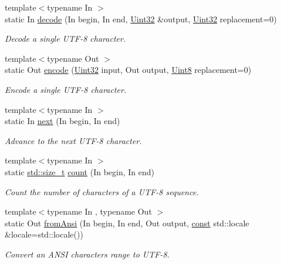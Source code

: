 \begin{DoxyCompactItemize}
{\footnotesize template$<$typename In $>$ }\\static In \hyperlink{classsf_1_1_utf_3_018_01_4_a59d4e8d5832961e62b263d308b72bf4b}{decode} (In begin, In end, \hyperlink{namespacesf_aa746fb1ddef4410bddf198ebb27e727c}{Uint32} \&output, \hyperlink{namespacesf_aa746fb1ddef4410bddf198ebb27e727c}{Uint32} replacement=0)
\begin{DoxyCompactList}\small\item\em Decode a single U\-T\-F-\/8 character. \end{DoxyCompactList}\item 
{\footnotesize template$<$typename Out $>$ }\\static Out \hyperlink{classsf_1_1_utf_3_018_01_4_a5fbc6b5a996f52e9e4a14633d0d71847}{encode} (\hyperlink{namespacesf_aa746fb1ddef4410bddf198ebb27e727c}{Uint32} input, Out output, \hyperlink{namespacesf_a4ef3d630785c4f296f9b4f274c33d78e}{Uint8} replacement=0)
\begin{DoxyCompactList}\small\item\em Encode a single U\-T\-F-\/8 character. \end{DoxyCompactList}\item 
{\footnotesize template$<$typename In $>$ }\\static In \hyperlink{classsf_1_1_utf_3_018_01_4_a0365a0b38700baa161843563d083edf6}{next} (In begin, In end)
\begin{DoxyCompactList}\small\item\em Advance to the next U\-T\-F-\/8 character. \end{DoxyCompactList}\item 
{\footnotesize template$<$typename In $>$ }\\static \hyperlink{nc__alloc_8h_a7b60c5629e55e8ec87a4547dd4abced4}{std\-::size\-\_\-t} \hyperlink{classsf_1_1_utf_3_018_01_4_af1f15d9a772ee887be39e97431e15d32}{count} (In begin, In end)
\begin{DoxyCompactList}\small\item\em Count the number of characters of a U\-T\-F-\/8 sequence. \end{DoxyCompactList}\item 
{\footnotesize template$<$typename In , typename Out $>$ }\\static Out \hyperlink{classsf_1_1_utf_3_018_01_4_a1b62ba85ad3c8ce68746e16192b3eef0}{from\-Ansi} (In begin, In end, Out output, \hyperlink{term__entry_8h_a57bd63ce7f9a353488880e3de6692d5a}{const} std\-::locale \&locale=std\-::locale())
\begin{DoxyCompactList}\small\item\em Convert an A\-N\-S\-I characters range to U\-T\-F-\/8. \end{DoxyCompactList}\item 

\end{DoxyCompactItemize}
